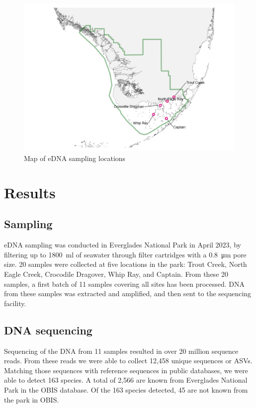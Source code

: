 \documentclass[10pt]{article}
\begin{document}
\begin{figure}[h]
\centering
\includegraphics[width=\textwidth]{map}
\caption{Map of eDNA sampling locations}
\end{figure}

\section*{Results}
\subsection*{Sampling}

\begin{multicols}{2}
eDNA sampling was conducted in Everglades National Park in April 2023, by filtering up to \SI{1800}{\milli\litre} of seawater through filter cartridges with a \SI{0.8}{\micro\metre} pore size. 20 samples were collected at five locations in the park: Trout Creek, North Eagle Creek, Crocodile Dragover, Whip Ray, and Captain. From these 20 samples, a first batch of 11 samples covering all sites has been processed. DNA from these samples was extracted and amplified, and then sent to the sequencing facility.
\end{multicols}

\subsection*{DNA sequencing}

\begin{multicols}{2}
Sequencing of the DNA from 11 samples resulted in over 20 million sequence reads. From these reads we were able to collect 12,458 unique sequences or ASVs. Matching those sequences with reference sequences in public databases, we were able to detect 163 species. A total of 2,566 are known from Everglades National Park in the OBIS database. Of the 163 species detected, 45 are not known from the park in OBIS.
\end{multicols}
\end{document}
